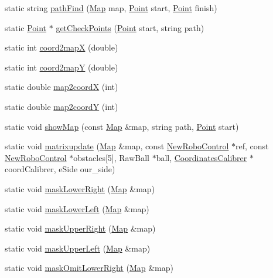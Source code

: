 \begin{DoxyCompactItemize}
\item 
static string \hyperlink{classInterpreter_a253118e59d7428286ff70a818efe0c52}{pathFind} (\hyperlink{classMatrix}{Map} map, \hyperlink{structInterpreter_1_1Point}{Point} start, \hyperlink{structInterpreter_1_1Point}{Point} finish)
\item 
static \hyperlink{structInterpreter_1_1Point}{Point} $\ast$ \hyperlink{classInterpreter_a17b252478116fc19ab8fe4623728cda8}{getCheckPoints} (\hyperlink{structInterpreter_1_1Point}{Point} start, string path)
\item 
static int \hyperlink{classInterpreter_a36e1b3f28a3d8dae2155f1f0212bed7d}{coord2mapX} (double)
\item 
static int \hyperlink{classInterpreter_a5b597351a6bdaf23fbf42aed910b151f}{coord2mapY} (double)
\item 
static double \hyperlink{classInterpreter_afaaf3930191f9ba3e48a09af193e0a39}{map2coordX} (int)
\item 
static double \hyperlink{classInterpreter_abd0885c42ade8eb7f941c8d4b26a2501}{map2coordY} (int)
\item 
static void \hyperlink{classInterpreter_ae09346bdc7e055a43f760cb2b868357f}{showMap} (const \hyperlink{classMatrix}{Map} \&map, string path, \hyperlink{structInterpreter_1_1Point}{Point} start)
\item 
static void \hyperlink{classInterpreter_a4b195c13b5189f82d5b2ccd47ee4c562}{matrixupdate} (\hyperlink{classMatrix}{Map} \&map, const \hyperlink{classNewRoboControl}{NewRoboControl} $\ast$ref, const \hyperlink{classNewRoboControl}{NewRoboControl} $\ast$obstacles\mbox{[}5\mbox{]}, RawBall $\ast$ball, \hyperlink{classCoordinatesCalibrer}{CoordinatesCalibrer} $\ast$coordCalibrer, eSide our\_\-side)
\item 
static void \hyperlink{classInterpreter_a5bafd4ac63cb3dee9a6ddff172a0df02}{maskLowerRight} (\hyperlink{classMatrix}{Map} \&map)
\item 
static void \hyperlink{classInterpreter_af02271dded17efbe47316706aad115f7}{maskLowerLeft} (\hyperlink{classMatrix}{Map} \&map)
\item 
static void \hyperlink{classInterpreter_a6741607033424bb90e95e59311941ed3}{maskUpperRight} (\hyperlink{classMatrix}{Map} \&map)
\item 
static void \hyperlink{classInterpreter_a1892fcf6bef01aa68c015c5a4a0c5f96}{maskUpperLeft} (\hyperlink{classMatrix}{Map} \&map)
\item 
static void \hyperlink{classInterpreter_a5aab0968d1a9c62fd20e1f11446deb73}{maskOmitLowerRight} (\hyperlink{classMatrix}{Map} \&map)

\end{DoxyCompactItemize}
